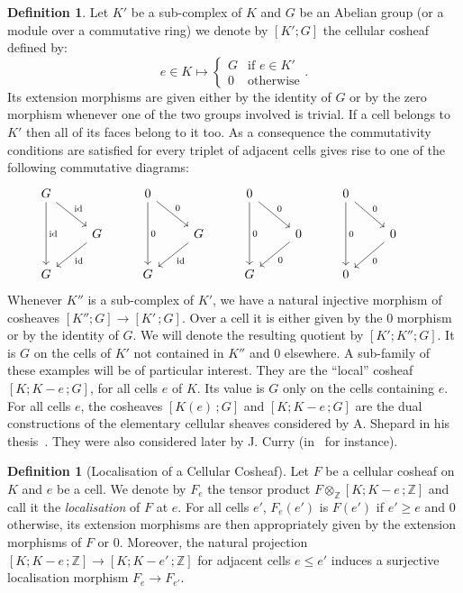 \documentclass[10pt]{amsart}
\theoremstyle{definition}
\newtheorem{defi}[theo]{Definition}
\numberwithin{equation}{section}
\numberwithin{figure}{section}
\newcommand{\Z}{\mathbb{Z}}
\DeclareMathOperator{\id}{id}
\begin{document}
\begin{defi}
Let $K'$ be a sub-complex of $K$ and $G$ be an Abelian group (or a module over a commutative ring) we denote by $[K';G]$ the cellular cosheaf defined by:
\begin{equation*}
e\in K \longmapsto \left\{
\begin{array}{cl} G & \text{if }e\in K' \\ 0 & \text{otherwise}
\end{array}\right..
\end{equation*}
Its extension morphisms are given either by the identity of $G$ or by the zero morphism whenever one of the two groups involved is trivial. If a cell belongs to $K'$ then all of its faces belong to it too. As a consequence the commutativity conditions are satisfied for every triplet of adjacent cells gives rise to one of the following commutative diagrams:
\begin{equation*}
\begin{tikzcd}
G \ar[dd,"\id"] \ar[dr,"\id"] & &  0 \ar[dd,"0"] \ar[dr,"0"] & &  0 \ar[dd,"0"] \ar[dr,"0"] & &  0 \ar[dd,"0"] \ar[dr,"0"] & & \\%
& G \ar[dl,"\id"] & &  G \ar[dl,"\id"] & &  0 \ar[dl,"0"] & &  0 \ar[dl,"0"] & \\%
G & &  G & &  G & &  0 & &
\end{tikzcd}
\end{equation*}
Whenever $K''$ is a sub-complex of $K'$, we have a natural injective morphism of cosheaves $[K'';G]\rightarrow [K'\,;G]$. Over a cell it is either given by the $0$ morphism or by the identity of $G$. We will denote the resulting quotient by $[K';K'';G]$. It is $G$ on the cells of $K'$ not contained in $K''$ and $0$ elsewhere. A sub-family of these examples will be of particular interest. They are the ``local'' cosheaf $[K;K-e\,;G]$, for all cells $e$ of $K$. Its value is $G$ only on the cells containing $e$. For all cells $e$, the cosheaves $[K(e)\,;G]$ and $[K;K-e\,;G]$ are the dual constructions of the elementary cellular sheaves considered by A. Shepard in his thesis~\cite{She_cel_des}. They were also considered later by J. Curry (in~\cite{Cur_she_cos} for instance).
\end{defi}

\begin{defi}[Localisation of a Cellular Cosheaf]
Let $F$ be a cellular cosheaf on $K$ and $e$ be a cell. We denote by $F_e$ the tensor product $F\otimes_\Z[K;K-e\,;\Z]$ and call it the \emph{localisation} of $F$ at $e$. For all cells $e'$, $F_e(e')$ is $F(e')$ if $e'\geq e$ and $0$ otherwise, its extension morphisms are then appropriately given by the extension morphisms of $F$ or $0$. Moreover, the natural projection $[K;K-e\,;\Z]\rightarrow [K;K-e'\,;\Z]$ for adjacent cells $e\leq e'$ induces a surjective localisation morphism $F_e\rightarrow F_{e'}$.
\end{defi}
\end{document}
